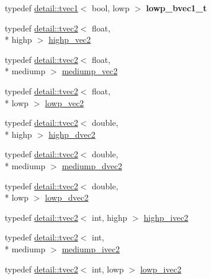 \begin{DoxyCompactItemize}
\item 
\hypertarget{namespaceglm_aac18f6553a7720c78e2c294053fb0551}{typedef \hyperlink{structglm_1_1detail_1_1tvec1}{detail\-::tvec1}$<$ bool, lowp $>$ {\bfseries lowp\-\_\-bvec1\-\_\-t}}\label{namespaceglm_aac18f6553a7720c78e2c294053fb0551}

\item 
typedef \hyperlink{structglm_1_1detail_1_1tvec2}{detail\-::tvec2}$<$ float, \\*
highp $>$ \hyperlink{group__core__precision_ga37645abcfcc1278567e99f1ca492bfbb}{highp\-\_\-vec2}
\item 
typedef \hyperlink{structglm_1_1detail_1_1tvec2}{detail\-::tvec2}$<$ float, \\*
mediump $>$ \hyperlink{group__core__precision_ga1365858c541931eb8a7473fa85a1d1cf}{mediump\-\_\-vec2}
\item 
typedef \hyperlink{structglm_1_1detail_1_1tvec2}{detail\-::tvec2}$<$ float, \\*
lowp $>$ \hyperlink{group__core__precision_gac63d79532b7e8d18f579ebe63e4fde49}{lowp\-\_\-vec2}
\item 
typedef \hyperlink{structglm_1_1detail_1_1tvec2}{detail\-::tvec2}$<$ double, \\*
highp $>$ \hyperlink{group__core__precision_gacfbe8512142fff27f0bfb44958c1752f}{highp\-\_\-dvec2}
\item 
typedef \hyperlink{structglm_1_1detail_1_1tvec2}{detail\-::tvec2}$<$ double, \\*
mediump $>$ \hyperlink{group__core__precision_gace1f1cc2eb8e978dcb60e682af87b541}{mediump\-\_\-dvec2}
\item 
typedef \hyperlink{structglm_1_1detail_1_1tvec2}{detail\-::tvec2}$<$ double, \\*
lowp $>$ \hyperlink{group__core__precision_ga27a115a27d5f065e8c043f57191d583b}{lowp\-\_\-dvec2}
\item 
typedef \hyperlink{structglm_1_1detail_1_1tvec2}{detail\-::tvec2}$<$ int, highp $>$ \hyperlink{group__core__precision_gab2bac6095f51f7d7f74747afc2f6747a}{highp\-\_\-ivec2}
\item 
typedef \hyperlink{structglm_1_1detail_1_1tvec2}{detail\-::tvec2}$<$ int, \\*
mediump $>$ \hyperlink{group__core__precision_ga4f1bf9844e667805235823afe809aa73}{mediump\-\_\-ivec2}
\item 
typedef \hyperlink{structglm_1_1detail_1_1tvec2}{detail\-::tvec2}$<$ int, lowp $>$ \hyperlink{group__core__precision_ga562c5c67d6431ab88fc4a032239e2137}{lowp\-\_\-ivec2}

\end{DoxyCompactItemize}
